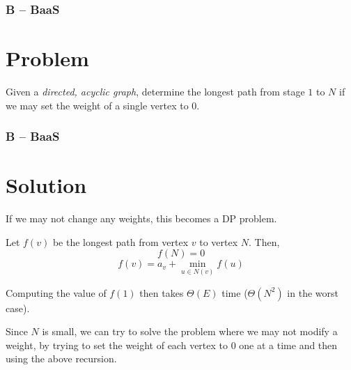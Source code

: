 \begin{frame}
  \frametitle{B -- BaaS}
  \section*{Problem}
  Given a \emph{directed, acyclic graph}, determine the longest path from stage $1$ to $N$ if we may set the weight of a single vertex to $0$.
\end{frame}
\begin{frame}
  \frametitle{B -- BaaS}
  \section*{Solution}
  If we may not change any weights, this becomes a DP problem.

  Let $f(v)$ be the longest path from vertex $v$ to vertex $N$. Then,
  $$f(N) = 0$$
  $$f(v) = a_v + \min_{u \in N(v)} f(u)$$

  Computing the value of $f(1)$ then takes $\Theta(E)$ time ($\Theta(N^2)$ in the worst case).

  Since $N$ is small, we can try to solve the problem where we may not modify a weight, by trying to set the weight of each vertex to $0$ one at a time
  and then using the above recursion.
\end{frame}
